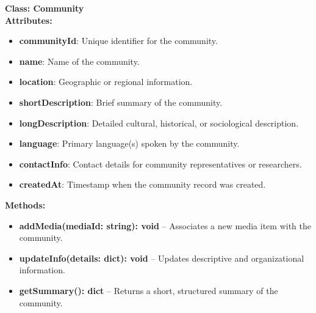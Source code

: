 \bigskip
\textbf{Class: Community}\\
\textbf{Attributes:}
\begin{itemize}
    \item \textbf{communityId}: Unique identifier for the community.
    \item \textbf{name}: Name of the community.
    \item \textbf{location}: Geographic or regional information.
    \item \textbf{shortDescription}: Brief summary of the community.
    \item \textbf{longDescription}: Detailed cultural, historical, or sociological description.
    \item \textbf{language}: Primary language(s) spoken by the community.
    \item \textbf{contactInfo}: Contact details for community representatives or researchers.
    \item \textbf{createdAt}: Timestamp when the community record was created.
\end{itemize}

\textbf{Methods:}
\begin{itemize}
    \item \textbf{addMedia(mediaId: string): void} -- Associates a new media item with the community.
    \item \textbf{updateInfo(details: dict): void} -- Updates descriptive and organizational information.
    \item \textbf{getSummary(): dict} -- Returns a short, structured summary of the community.
\end{itemize}

